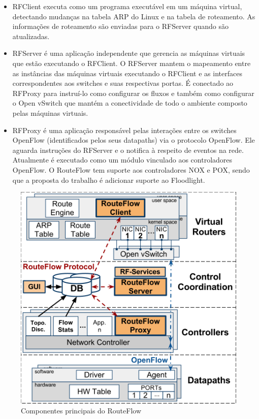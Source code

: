 \begin{itemize} 
\item RFClient executa como um programa
executável em um máquina virtual, detectando
mudanças na tabela ARP do Linux e na tabela de roteamento.
As informações de roteamento são enviadas para o
RFServer quando são atualizadas.
\item RFServer é uma aplicação independente que gerencia as
máquinas virtuais que estão executando o RFClient. O
RFServer mantem o mapeamento entre as instâncias das
máquinas virtuais executando o RFClient e as interfaces
correspondentes aos switches e suas respectivas portas. É
conectado ao RFProxy para instruí-lo como configurar os
fluxos e também como configurar o Open vSwitch que mantém a
conectividade de todo o ambiente composto pelas máquinas virtuais.
\item RFProxy é uma aplicação responsável pelas interações
entre os switches OpenFlow (identificados pelos seus
datapaths) via o protocolo OpenFlow. Ele aguarda instruções
do RFServer e o notifica à respeito de eventos na rede.
Atualmente é executado como um módulo vinculado aos
controladores OpenFlow. O RouteFlow tem suporte aos
controladores NOX e POX, sendo que a proposta do trabalho é
adicionar suporte ao Floodlight. 
\end{itemize}

\begin{figure}[hb] 
\centering
\includegraphics[width=125mm]{componentesRouteFlow.png}
\caption{Componentes principais do RouteFlow}
\label{fig:componentesRouteFlow} 
\end{figure}

